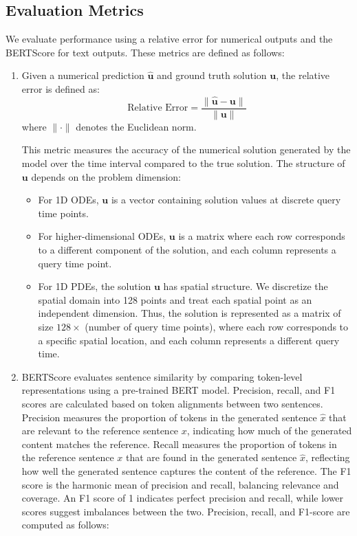 \documentclass{article}
\begin{document}
\subsection{Evaluation Metrics}
We evaluate performance using a {relative error} for numerical outputs and the {BERTScore} for text outputs. These metrics are defined as follows:
\begin{enumerate}
    \item Given a numerical prediction \(\hat{\bm{u}}\) and ground truth solution \(\bm{u}\), the relative error is defined as:  
    \[
    \text{Relative Error} = \frac{\|\hat{\bm{u}} - \bm{u}\|}{\|\bm{u}\|}
    \]
    where \(\|\cdot\|\) denotes the Euclidean norm.  

    This metric measures the accuracy of the numerical solution generated by the model over the time interval compared to the true solution. The structure of \(\bm{u}\) depends on the problem dimension:  
    \begin{itemize}  
        \item For 1D ODEs, \(\bm{u}\) is a vector containing solution values at discrete query time points.  
        \item For higher-dimensional ODEs, \(\bm{u}\) is a matrix where each row corresponds to a different component of the solution, and each column represents a query time point.  
        \item For 1D PDEs, the solution \(\bm{u}\) has spatial structure. We discretize the spatial domain into 128 points and treat each spatial point as an independent dimension. Thus, the solution is represented as a matrix of size \(128 \times\) (number of query time points), where each row corresponds to a specific spatial location, and each column represents a different query time.  
    \end{itemize}  

\item {BERTScore} evaluates sentence similarity by comparing token-level representations using a pre-trained BERT model. Precision, recall, and F1 scores are calculated based on token alignments between two sentences. {Precision} measures the proportion of tokens in the generated sentence \(\hat{x}\) that are relevant to the reference sentence \(x\), indicating how much of the generated content matches the reference. {Recall} measures the proportion of tokens in the reference sentence \(x\) that are found in the generated sentence \(\hat{x}\), reflecting how well the generated sentence captures the content of the reference. The {F1 score} is the harmonic mean of precision and recall, balancing relevance and coverage. An F1 score of 1 indicates perfect precision and recall, while lower scores suggest imbalances between the two. Precision, recall, and F1-score are computed as follows:


\end{enumerate}
\end{document}
